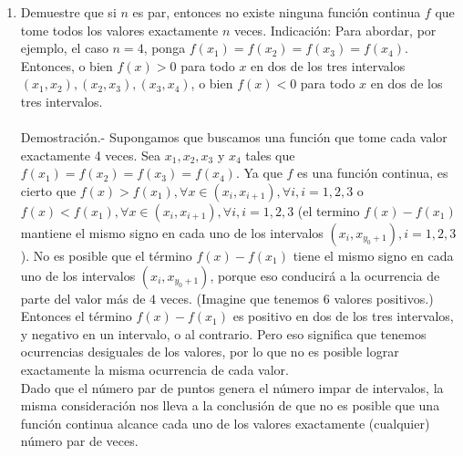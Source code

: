 \begin{enumerate}[\bfseries 1.]
\begin{enumerate}[\bfseries a)]
	\item Demuestre que si $n$ es par, entonces no existe ninguna función continua $f$ que tome todos los valores exactamente $n$ veces. Indicación: Para abordar, por ejemplo, el caso $n = 4$, ponga $f(x_1) = f(x_2 ) = f(x_3 ) = f(x_4)$. Entonces, o bien $f(x) > 0$ para todo $x$ en dos de los tres intervalos $(x_1,x_2), (x_2 ,x_3 ), (x_3 ,x_4)$, o bien $f(x) < 0$ para todo $x$ en dos de los tres intervalos.\\\\
	    Demostración.-\; Supongamos que buscamos una función que tome cada valor exactamente 4 veces. Sea $x_1,x_2,x_3$ y $x_4$ tales que $f(x_1)=f(x_2)=f(x_3)=f(x_4).$ Ya que $f$ es una función continua, es cierto que $f(x)>f(x_1), \forall x \in (x_i,x_{i+1}), \forall i, i=1,2,3$ o $f(x)<f(x_1), \forall x \in (x_i,x_{i+1}), \forall i, i=1,2,3$ (el termino $f(x)-f(x_1)$ mantiene el mismo signo en cada uno de los intervalos $(x_i,x_{y_0+1}), i=1,2,3$). No es posible que el término $f(x)-f(x_1)$ tiene el mismo signo en cada uno de los intervalos $(x_i,x_{y_0+1})$, porque eso conducirá a la ocurrencia de parte del valor más de $4$ veces. (Imagine que tenemos 6 valores positivos.) Entonces el término $f(x)-f(x_1)$ es positivo en dos de los tres intervalos, y negativo en un intervalo, o al contrario. Pero eso significa que tenemos ocurrencias desiguales de los valores, por lo que no es posible lograr exactamente la misma ocurrencia de cada valor.\\
	    Dado que el número par de puntos genera el número impar de intervalos, la misma consideración nos lleva a la conclusión de que no es posible que una función continua alcance cada uno de los valores exactamente (cualquier) número par de veces.\\\\


    \end{enumerate}

\end{enumerate}
